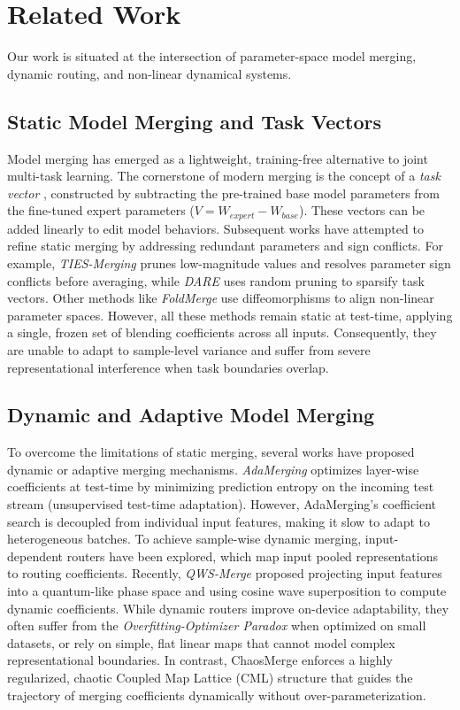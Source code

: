 \section{Related Work}
\label{sec:related_work}

Our work is situated at the intersection of parameter-space model merging, dynamic routing, and non-linear dynamical systems.

\subsection{Static Model Merging and Task Vectors}
Model merging has emerged as a lightweight, training-free alternative to joint multi-task learning. The cornerstone of modern merging is the concept of a \emph{task vector} \cite{ilharco2022editing}, constructed by subtracting the pre-trained base model parameters from the fine-tuned expert parameters ($V = W_{expert} - W_{base}$). These vectors can be added linearly to edit model behaviors. Subsequent works have attempted to refine static merging by addressing redundant parameters and sign conflicts. For example, \emph{TIES-Merging} \cite{yadav2023ties} prunes low-magnitude values and resolves parameter sign conflicts before averaging, while \emph{DARE} \cite{yu2024language} uses random pruning to sparsify task vectors. Other methods like \emph{FoldMerge} use diffeomorphisms to align non-linear parameter spaces. However, all these methods remain static at test-time, applying a single, frozen set of blending coefficients across all inputs. Consequently, they are unable to adapt to sample-level variance and suffer from severe representational interference when task boundaries overlap.

\subsection{Dynamic and Adaptive Model Merging}
To overcome the limitations of static merging, several works have proposed dynamic or adaptive merging mechanisms. \emph{AdaMerging} \cite{yang2023adamerging} optimizes layer-wise coefficients at test-time by minimizing prediction entropy on the incoming test stream (unsupervised test-time adaptation). However, AdaMerging's coefficient search is decoupled from individual input features, making it slow to adapt to heterogeneous batches. 
To achieve sample-wise dynamic merging, input-dependent routers have been explored, which map input pooled representations to routing coefficients.
Recently, \emph{QWS-Merge} proposed projecting input features into a quantum-like phase space and using cosine wave superposition to compute dynamic coefficients.
While dynamic routers improve on-device adaptability, they often suffer from the \emph{Overfitting-Optimizer Paradox} \cite{trial2_submission3} when optimized on small datasets, or rely on simple, flat linear maps that cannot model complex representational boundaries. In contrast, ChaosMerge enforces a highly regularized, chaotic Coupled Map Lattice (CML) structure that guides the trajectory of merging coefficients dynamically without over-parameterization.

